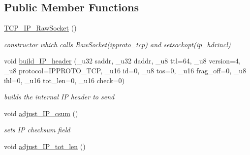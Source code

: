 \subsection*{Public Member Functions}
\begin{CompactItemize}
\item 
\hypertarget{classsocketpp_1_1TCP__IP__RawSocket_1b08f12274fd9590f805bc876c44edd9}{
\hyperlink{classsocketpp_1_1TCP__IP__RawSocket_1b08f12274fd9590f805bc876c44edd9}{TCP\_\-IP\_\-RawSocket} ()}
\label{classsocketpp_1_1TCP__IP__RawSocket_1b08f12274fd9590f805bc876c44edd9}

\begin{CompactList}\small\item\em constructor which calls RawSocket(ipproto\_\-tcp) and setsockopt(ip\_\-hdrincl) \item\end{CompactList}\item 
\hypertarget{classsocketpp_1_1TCP__IP__RawSocket_10edb8c09e89f09c0b99b5b2febce821}{
void \hyperlink{classsocketpp_1_1TCP__IP__RawSocket_10edb8c09e89f09c0b99b5b2febce821}{build\_\-IP\_\-header} (\_\-u32 saddr, \_\-u32 daddr, \_\-u8 ttl=64, \_\-u8 version=4, \_\-u8 protocol=IPPROTO\_\-TCP, \_\-u16 id=0, \_\-u8 tos=0, \_\-u16 frag\_\-off=0, \_\-u8 ihl=0, \_\-u16 tot\_\-len=0, \_\-u16 check=0)}
\label{classsocketpp_1_1TCP__IP__RawSocket_10edb8c09e89f09c0b99b5b2febce821}

\begin{CompactList}\small\item\em builds the internal IP header to send \item\end{CompactList}\item 
\hypertarget{classsocketpp_1_1TCP__IP__RawSocket_cabdd9a217d59c0c2c5511e01c222427}{
void \hyperlink{classsocketpp_1_1TCP__IP__RawSocket_cabdd9a217d59c0c2c5511e01c222427}{adjust\_\-IP\_\-csum} ()}
\label{classsocketpp_1_1TCP__IP__RawSocket_cabdd9a217d59c0c2c5511e01c222427}

\begin{CompactList}\small\item\em sets IP checksum field \item\end{CompactList}\item 
\hypertarget{classsocketpp_1_1TCP__IP__RawSocket_e9c3cfe3d011cbf85653240aa30f3f17}{
void \hyperlink{classsocketpp_1_1TCP__IP__RawSocket_e9c3cfe3d011cbf85653240aa30f3f17}{adjust\_\-IP\_\-tot\_\-len} ()}
\label{classsocketpp_1_1TCP__IP__RawSocket_e9c3cfe3d011cbf85653240aa30f3f17}


\end{CompactItemize}
